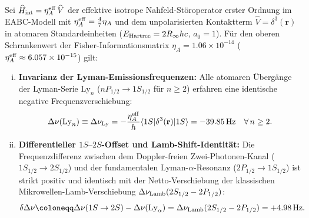 \begin{lemma}
\label{lem:lyman_universal_shift}
Sei $\widehat{H}_{\rm int} = \eta_A^{\rm eff} \, \widehat{V}$ der effektive isotrope Nahfeld-Störoperator erster Ordnung im EABC-Modell mit $\eta_A^{\rm eff} = \frac{4}{7}\eta_A$ und dem unpolarisierten Kontaktterm $\widehat{V} = \delta^3(\mathbf{r})$ in atomaren Standardeinheiten ($E_{\rm Hartree} = 2 R_\infty h c$, $a_0 = 1$). 
Für den oberen Schrankenwert der Fisher-Informationsmatrix $\eta_A = 1.06 \times 10^{-14}$ ($\eta_A^{\rm eff} \approx 6.057 \times 10^{-15}$) gilt:

\begin{enumerate}[(i)]
    \item \textbf{Invarianz der Lyman-Emissionsfrequenzen:} Alle atomaren Übergänge der Lyman-Serie $\text{Ly}_n$ ($nP_{1/2} \to 1S_{1/2}$ für $n \ge 2$) erfahren eine identische negative Frequenzverschiebung:
    \begin{equation}
        \Delta\nu(\text{Ly}_n) \equiv \Delta\nu_{\rm Ly} = -\frac{\eta_A^{\rm eff}}{h} \langle 1S | \delta^3(\mathbf{r}) | 1S \rangle = -39.85\,\text{Hz} \quad \forall \, n \ge 2.
    \end{equation}
    
    \item \textbf{Differentieller $1S\text{--}2S$-Offset und Lamb-Shift-Identität:} Die Frequenzdifferenz zwischen dem Doppler-freien Zwei-Photonen-Kanal ($1S_{1/2} \to 2S_{1/2}$) und der fundamentalen Lyman-$\alpha$-Resonanz ($2P_{1/2} \to 1S_{1/2}$) ist strikt positiv und identisch mit der Netto-Verschiebung der klassischen Mikrowellen-Lamb-Verschiebung $\Delta\nu_{\rm Lamb}(2S_{1/2} - 2P_{1/2})$:
    \begin{equation}
        \delta\Delta\nu \coloneqq \Delta\nu(1S \to 2S) - \Delta\nu(\text{Ly}_\alpha) = \Delta\nu_{\rm Lamb}(2S_{1/2} - 2P_{1/2}) = +4.98\,\text{Hz}.
    \end{equation}
\end{enumerate}
\end{lemma}

